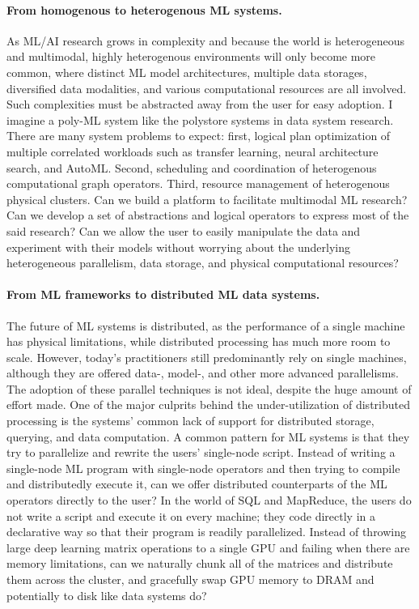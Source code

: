 \documentclass[letterpaper]{article}
\begin{document}
\paragraph{From homogenous to heterogenous ML systems.} As ML/AI research grows in complexity and because the world is heterogeneous and multimodal, highly heterogenous environments will only become more common, where distinct ML model architectures, multiple data storages, diversified data modalities, and various computational resources are all involved. Such complexities must be abstracted away from the user for easy adoption. I imagine a poly-ML system like the polystore systems in data system research. There are many system problems to expect: first, logical plan optimization of multiple correlated workloads such as transfer learning, neural architecture search, and AutoML. Second, scheduling and coordination of heterogenous computational graph operators. Third, resource management of heterogenous physical clusters. Can we build a platform to facilitate multimodal ML research? Can we develop a set of abstractions and logical operators to express most of the said research? Can we allow the user to easily manipulate the data and experiment with their models without worrying about the underlying heterogeneous parallelism, data storage, and physical computational resources? 

\paragraph{From ML frameworks to distributed ML data systems.} The future of ML systems is distributed, as the performance of a single machine has physical limitations, while distributed processing has much more room to scale. However, today's practitioners still predominantly rely on single machines, although they are offered data-, model-, and other more advanced parallelisms. The adoption of these parallel techniques is not ideal, despite the huge amount of effort made. One of the major culprits behind the under-utilization of distributed processing is the systems' common lack of support for distributed storage, querying, and data computation. A common pattern for ML systems is that they try to parallelize and rewrite the users' single-node script. Instead of writing a single-node ML program with single-node operators and then trying to compile and distributedly execute it, can we offer distributed counterparts of the ML operators directly to the user? In the world of SQL and MapReduce, the users do not write a script and execute it on every machine; they code directly in a declarative way so that their program is readily parallelized. Instead of throwing large deep learning matrix operations to a single GPU and failing when there are memory limitations, can we naturally chunk all of the matrices and distribute them across the cluster, and gracefully swap GPU memory to DRAM and potentially to disk like data systems do? 
\end{document}
